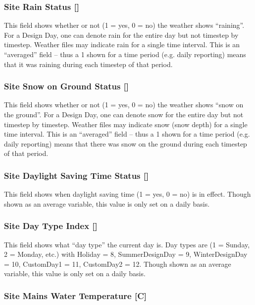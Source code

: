 \subsubsection{Site Rain Status {[]}}\label{site-rain-status}

This field shows whether or not (1 = yes, 0 = no) the weather shows ``raining''. For a Design Day, one can denote rain for the entire day but not timestep by timestep. Weather files may indicate rain for a single time interval. This is an ``averaged'' field -- thus a 1 shown for a time period (e.g. daily reporting) means that it was raining during each timestep of that period.

\subsubsection{Site Snow on Ground Status {[]}}\label{site-snow-on-ground-status}

This field shows whether or not (1 = yes, 0 = no) the weather shows ``snow on the ground''. For a Design Day, one can denote snow for the entire day but not timestep by timestep. Weather files may indicate snow (snow depth) for a single time interval. This is an ``averaged'' field -- thus a 1 shown for a time period (e.g. daily reporting) means that there was snow on the ground during each timestep of that period.

\subsubsection{Site Daylight Saving Time Status {[]}}\label{site-daylight-saving-time-status}

This field shows when daylight saving time (1 = yes, 0 = no) is in effect. Though shown as an average variable, this value is only set on a daily basis.

\subsubsection{Site Day Type Index {[]}}\label{site-day-type-index}

This field shows what ``day type'' the current day is. Day types are (1 = Sunday, 2 = Monday, etc.) with Holiday = 8, SummerDesignDay = 9, WinterDesignDay = 10, CustomDay1 = 11, CustomDay2 = 12. Though shown as an average variable, this value is only set on a daily basis.

\subsubsection{Site Mains Water Temperature {[}C{]}}\label{site-mains-water-temperature-c}


